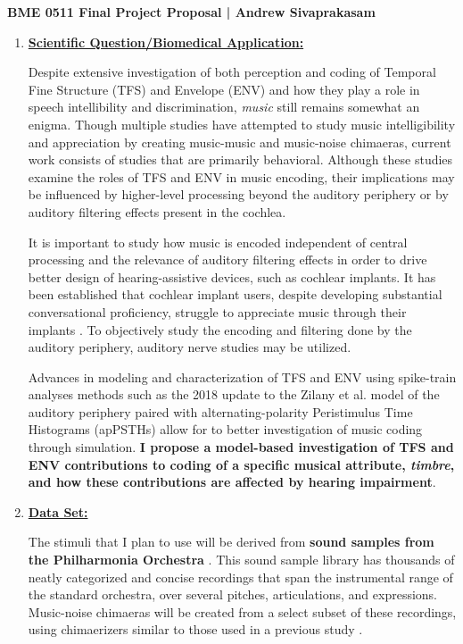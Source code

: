 \documentclass[9pt]{article}
\begin{document}
\begin{center}
{\Large \textbf{BME 0511 Final Project Proposal | Andrew Sivaprakasam}}
\end{center}
\vspace{.25em}
\begin{enumerate}

\item \textbf{\underline{Scientific Question/Biomedical Application:}}

Despite extensive investigation of both perception and coding of Temporal Fine Structure (TFS) and Envelope (ENV) and how they play a role in speech intellibility and discrimination, \textit{music} still remains somewhat an enigma. Though multiple studies have attempted to study music intelligibility and appreciation by creating music-music and music-noise chimaeras, current work consists of studies that are primarily behavioral. Although these studies examine the roles of TFS and ENV in music encoding, their implications may be influenced by higher-level processing beyond the auditory periphery or by auditory filtering effects present in the cochlea. 

It is important to study how music is encoded independent of central processing and the relevance of auditory filtering effects in order to drive better design of hearing-assistive devices, such as cochlear implants. It has been established that cochlear implant users, despite developing substantial conversational proficiency, struggle to appreciate music through their implants \cite{heng_impaired_2011}. To objectively study the encoding and filtering done by the auditory periphery, auditory nerve studies may be utilized.

Advances in modeling and characterization of TFS and ENV using spike-train analyses methods such as the 2018 update to the Zilany et al. model of the auditory periphery paired with alternating-polarity Peristimulus Time Histograms (apPSTHs) allow for to better investigation of music coding through simulation. \textbf{I propose a model-based investigation of TFS and ENV contributions to coding of a specific musical attribute, \textit{timbre}, and how these contributions are affected by hearing impairment}.   

\item \textbf{\underline{Data Set:}}

The stimuli that I plan to use will be derived from \textbf{sound samples from the Philharmonia Orchestra} \cite{noauthor_sound_nodate}. This sound sample library has thousands of neatly categorized and concise recordings that span the instrumental range of the standard orchestra, over several pitches, articulations, and expressions. Music-noise chimaeras will be created from a select subset of these recordings, using chimaerizers similar to those used in a previous study \cite{smith_chimaeric_2002}. 


\end{enumerate}
\end{document}
